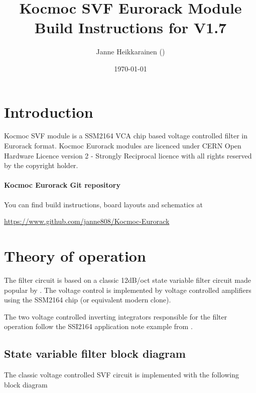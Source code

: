 \documentclass{article}
\title{Kocmoc SVF Eurorack Module Build Instructions for V1.7}
\author{Janne Heikkarainen (\email{janne808@radiofreerobotron.net}) \\
	}
\date{\today}
\begin{document}
\maketitle

\section{Introduction}
Kocmoc SVF module is a SSM2164 VCA chip based voltage controlled filter in Eurorack format. Kocmoc Eurorack modules are licenced under CERN Open Hardware Licence version 2 - Strongly Reciprocal licence with all rights reserved by the copyright holder. \newline

\paragraph{Kocmoc Eurorack Git repository}
\begin{flushleft}
You can find build instructions, board layouts and schematics at \newline
\end{flushleft}
\begin{center}
\href{https://www.github.com/janne808/Kocmoc-Eurorack}{https://www.github.com/janne808/Kocmoc-Eurorack}
\end{center}

\section{Theory of operation} \label{theoryofoperation}

The filter circuit is based on a classic 12dB/oct state variable filter circuit made popular by \cite{chamberlin}. The voltage control is implemented by voltage controlled amplifiers using the SSM2164 chip (or equivalent modern clone).\newline


The two voltage controlled inverting integrators responsible for the filter operation follow the SSI2164 application note example from \cite{allaert}.\newline

\subsection{State variable filter block diagram}

The classic voltage controlled SVF circuit is implemented with the following block diagram
\end{document}
